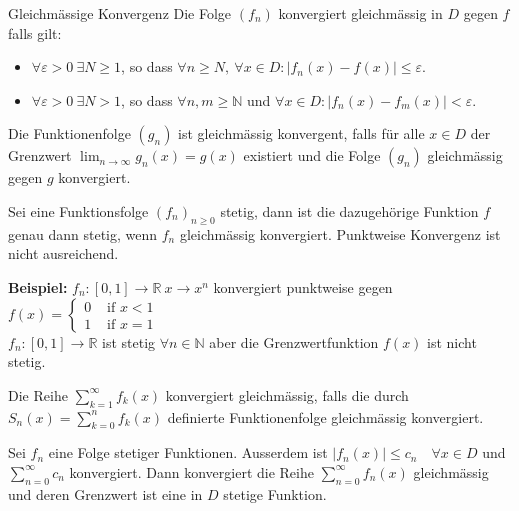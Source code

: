 \documentclass[a4paper,fontsize = 7pt]{scrartcl}
\def\limn{\lim_{n\to \infty}}
\def\sumk{\sum_{k=1}^\infty}
\def\R{\mathbb{R}}
\def\N{\mathbb{N}}
\begin{document}
\begin{mainbox}{Gleichmässige Konvergenz}
  \vspace{-4pt}
 Die Folge $(f_n)$ konvergiert gleichmässig in $D$ gegen $f$ falls gilt:
 \begin{itemize}
  \item $\forall \varepsilon > 0 \ \exists N \ge 1$, so dass $\forall n \ge N, \ \forall x \in D: | f_n(x) - f(x) | \le \varepsilon$. 
  \item $\forall \varepsilon > 0 \ \exists N > 1$, so dass $\forall n, m \geq \N$ und $\forall x \in D: |f_n(x) - f_m(x)| < \varepsilon$.  
\end{itemize}
 Die Funktionenfolge $(g_n)$ ist gleichmässig konvergent, falls für alle $x\in D$ der Grenzwert $\limn g_n(x) = g(x)$ existiert und die Folge $(g_n)$ gleichmässig gegen $g$ konvergiert.
 \vspace{-12pt}
\end{mainbox}
Sei eine Funktionsfolge $(f_n)_{n \geq 0}$ stetig, dann ist die dazugehörige Funktion $f$ genau dann stetig, wenn $f_n$ gleichmässig konvergiert. Punktweise Konvergenz ist nicht ausreichend.
\begin{subbox}{}
  \vspace{-4pt}
  \textbf{Beispiel: }$f_n: [0, 1] \to \R \ x \to x^n$ konvergiert punktweise gegen $f(x) = \left\{
    \begin{array}{ll}
      0  & \mbox{ if } x < 1 \\
      1 & \mbox{ if } x = 1
    \end{array}
  \right.$
  \\$f_n: [0, 1] \to \R$ ist stetig $\forall n \in \N$
  aber die Grenzwertfunktion $f(x)$ ist nicht stetig.
  \vspace{-4pt}
\end{subbox}


Die Reihe $\sumk f_k(x)$ konvergiert gleichmässig, falls die durch $S_n(x) = \sum_{k=0}^n f_k(x)$ definierte Funktionenfolge gleichmässig konvergiert.

\begin{subbox}{}
  \vspace{-4pt}
 Sei $f_n$ eine Folge stetiger Funktionen. Ausserdem ist $|f_n(x)| \le c_n \quad \forall x \in D$ und $\sum_{n=0}^\infty c_n$ konvergiert. Dann konvergiert die Reihe $\sum_{n=0}^\infty f_n(x)$ gleichmässig und deren Grenzwert ist eine in $D$ stetige Funktion.
 \vspace{-4pt}
\end{subbox}
\end{document}
